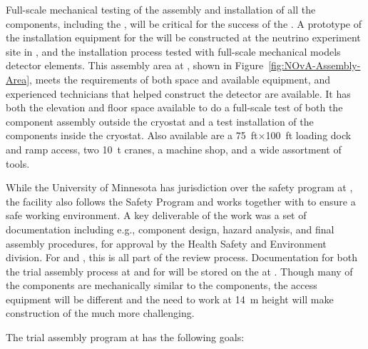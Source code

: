 Full-scale mechanical testing of the assembly and installation of all the  components, including the , will be critical for the success of the . 
A prototype of the installation equipment for the   will be constructed at the  neutrino experiment  site in , %
and the installation process tested with full-scale mechanical models detector elements.  
This assembly area at , shown in Figure~\ref{fig:NOvA-Assembly-Area}, meets the requirements of both space and available equipment, and experienced technicians that helped construct the  detector are available. 
It has both the elevation and floor space available to do a full-scale test of both the component assembly outside the cryostat and a test installation of the  components  inside the
cryostat. 
Also available are a \SI{75}{ft}$\times$\SI{100}{ft} loading dock and ramp access, two \SI{10}{t} cranes, a machine shop, and a wide assortment of tools. 

While the University of Minnesota has jurisdiction over the safety program at , the facility also follows the  Safety Program and works together with  to ensure a safe working environment.  
A key deliverable of the  work was a set of documentation including e.g.,   
component design,  hazard analysis, and final assembly procedures, for approval by the  Health Safety and Environment division. 
For   and , this is all part of the  review process. 
Documentation for both the trial assembly process at   and for  will be stored on the  at . 
Though many of the  components are mechanically similar to the  components, the access equipment will be different and the need to work at \SI{14}{m} height will make construction of the  much more challenging.  


The   trial assembly program at  has the following goals:

